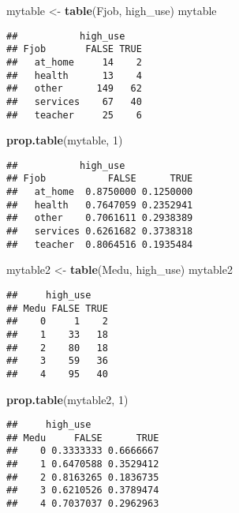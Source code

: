 \documentclass[]{article}
\newenvironment{Shaded}{\begin{snugshade}}{\end{snugshade}}
\newcommand{\DecValTok}[1]{\textcolor[rgb]{0.00,0.00,0.81}{#1}}
\newcommand{\KeywordTok}[1]{\textcolor[rgb]{0.13,0.29,0.53}{\textbf{#1}}}
\newcommand{\NormalTok}[1]{#1}
\newcommand{\StringTok}[1]{\textcolor[rgb]{0.31,0.60,0.02}{#1}}
\begin{document}
\begin{Shaded}
\begin{Highlighting}[]
\NormalTok{mytable <-}\StringTok{ }\KeywordTok{table}\NormalTok{(Fjob, high_use)}
\NormalTok{mytable}
\end{Highlighting}
\end{Shaded}

\begin{verbatim}
##           high_use
## Fjob       FALSE TRUE
##   at_home     14    2
##   health      13    4
##   other      149   62
##   services    67   40
##   teacher     25    6
\end{verbatim}

\begin{Shaded}
\begin{Highlighting}[]
\KeywordTok{prop.table}\NormalTok{(mytable, }\DecValTok{1}\NormalTok{)}
\end{Highlighting}
\end{Shaded}

\begin{verbatim}
##           high_use
## Fjob           FALSE      TRUE
##   at_home  0.8750000 0.1250000
##   health   0.7647059 0.2352941
##   other    0.7061611 0.2938389
##   services 0.6261682 0.3738318
##   teacher  0.8064516 0.1935484
\end{verbatim}

\begin{Shaded}
\begin{Highlighting}[]
\NormalTok{mytable2 <-}\StringTok{ }\KeywordTok{table}\NormalTok{(Medu, high_use)}
\NormalTok{mytable2}
\end{Highlighting}
\end{Shaded}

\begin{verbatim}
##     high_use
## Medu FALSE TRUE
##    0     1    2
##    1    33   18
##    2    80   18
##    3    59   36
##    4    95   40
\end{verbatim}

\begin{Shaded}
\begin{Highlighting}[]
\KeywordTok{prop.table}\NormalTok{(mytable2, }\DecValTok{1}\NormalTok{)}
\end{Highlighting}
\end{Shaded}

\begin{verbatim}
##     high_use
## Medu     FALSE      TRUE
##    0 0.3333333 0.6666667
##    1 0.6470588 0.3529412
##    2 0.8163265 0.1836735
##    3 0.6210526 0.3789474
##    4 0.7037037 0.2962963
\end{verbatim}
\end{document}
